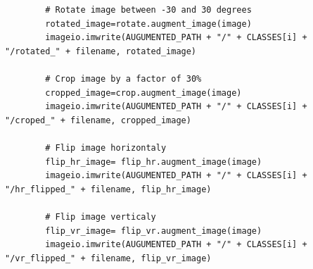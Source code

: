 \begin{longlisting}
\begin{verbatim}
        # Rotate image between -30 and 30 degrees
        rotated_image=rotate.augment_image(image)
        imageio.imwrite(AUGUMENTED_PATH + "/" + CLASSES[i] + "/rotated_" + filename, rotated_image)

        # Crop image by a factor of 30%
        cropped_image=crop.augment_image(image)
        imageio.imwrite(AUGUMENTED_PATH + "/" + CLASSES[i] + "/croped_" + filename, cropped_image)

        # Flip image horizontaly
        flip_hr_image= flip_hr.augment_image(image)
        imageio.imwrite(AUGUMENTED_PATH + "/" + CLASSES[i] + "/hr_flipped_" + filename, flip_hr_image)

        # Flip image verticaly
        flip_vr_image= flip_vr.augment_image(image)
        imageio.imwrite(AUGUMENTED_PATH + "/" + CLASSES[i] + "/vr_flipped_" + filename, flip_vr_image)

  \end{verbatim}
\end{longlisting}

